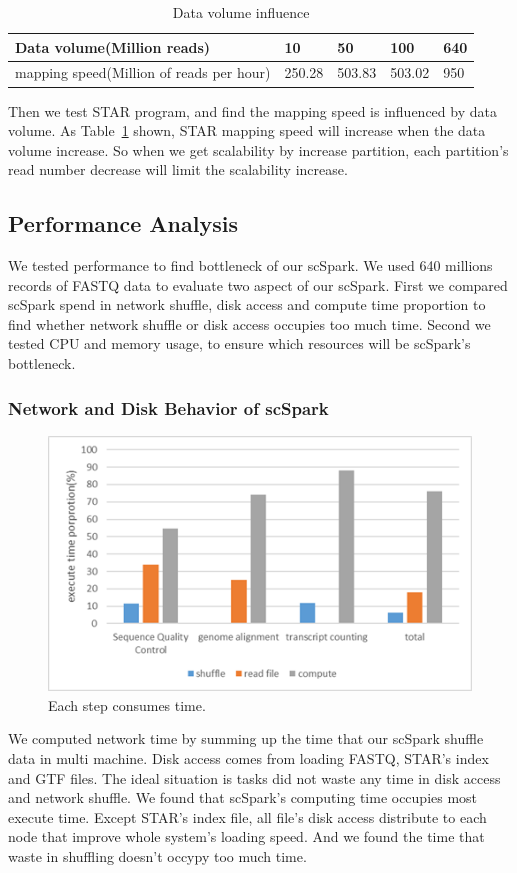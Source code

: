 \documentclass[runningheads]{llncs}
\begin{document}
\begin{table}
  \centering
  \caption{Data volume influence}\label{tab3}
  \begin{tabular}{l | l | l | l | l}
  \hline
  Data volume(Million reads) & 10 & 50 & 100 & 640 \\
  \hline
  mapping speed(Million of reads per hour) & 250.28 & 503.83 & 503.02 & 950 \\
  \hline
  \end{tabular}
\end{table}

Then we test STAR program, and find the mapping speed is influenced by data volume.
As Table~\ref{tab3} shown, STAR mapping speed will increase when the data volume increase.
So when we get scalability by increase partition, each partition's read number decrease will limit the scalability increase.

\subsection{Performance Analysis}
We tested performance to find bottleneck of our scSpark.
We used 640 millions records of FASTQ data to evaluate two aspect of our scSpark.
First we compared scSpark spend in network shuffle, disk access and compute time proportion to find whether network shuffle or disk access occupies too much time.
Second we tested CPU and memory usage, to ensure which resources will be scSpark's bottleneck.

\subsubsection{Network and Disk Behavior of scSpark}
\begin{figure}
  \includegraphics[width=\textwidth]{fig7.png}
  \caption{Each step consumes time.} \label{fig7}
\end{figure}
We computed network time by summing up the time that our scSpark shuffle data in multi machine.
Disk access comes from loading FASTQ, STAR's index and GTF files.
The ideal situation is tasks did not waste any time in disk access and network shuffle.
We found that scSpark's computing time occupies most execute time.
Except STAR's index file, all file's disk access distribute to each node that improve whole system's loading speed.
And we found the time that waste in shuffling doesn't occypy too much time.
\end{document}
